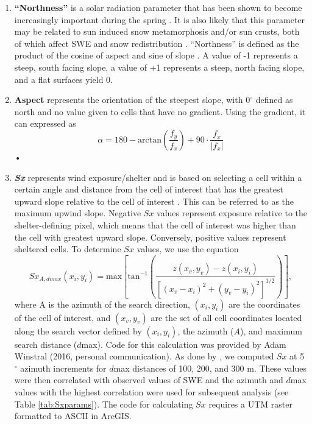 \documentclass[12pt]{article}
\begin{document}
\begin{enumerate}
\item[] \textbf{``Northness''} is a solar radiation parameter that has been shown to become increasingly important during the spring \citep{Revuelto2014}. It is also likely that this parameter may be related to sun induced snow metamorphosis and/or sun crusts, both of which affect SWE and snow redistribution \citep{McGrath2015}. ``Northness'' is defined as the product of the cosine of aspect and sine of slope \citep{Molotch2005}. A value of -1 represents a steep, south facing slope, a value of +1 represents a steep, north facing slope, and a flat surfaces yield 0. 

\item[] \textbf{Aspect} represents the orientation of the steepest slope, with 0${^\circ}$ defined as north and no value given to cells that have no gradient. Using the gradient, it can expressed as \citep{Olaya2009}
	\begin{equation}
	\alpha = 180 - \textrm{arctan}\left(\frac{ f_y}{ f_x}\right)+90 \cdot \frac{ f_x}{| f_x|}
	\end{equation}•

\item[] \textbf{\textit{Sx}} represents wind exposure/shelter and is based on selecting a cell within a certain angle and distance from the cell of interest that has the greatest upward slope relative to the cell of interest \citep{Winstral2002}. This can be referred to as the maximum upwind slope. Negative $Sx$ values represent exposure relative to the shelter-defining pixel, which means that the cell of interest was higher than the cell with greatest upward slope. Conversely, positive values represent sheltered cells. To determine $Sx$ values, we use the equation
\begin{equation}
Sx_{A, dmax}(x_i, y_i) = \textrm{max} \left[ \textrm{tan}^{-1} \left( \frac{z(x_v,y_v)-z(x_i,y_i)}{[(x_v-x_i)^2+(y_v-y_i)^2]^{1/2}} \right) \right] ,
\end{equation}
where A is the azimuth of the search direction, $(x_i, y_i)$ are the coordinates of the cell of interest, and $(x_v, y_v)$ are the set of all cell coordinates located along the search vector defined by	$(x_i, y_i)$, the azimuth ($A$), and maximum search distance ($d$max). Code for this calculation was provided by Adam Winstral (2016, personal communication). As done by \cite{McGrath2015}, we computed $Sx$ at 5$^{\circ}$ azimuth increments for $d$max distances of 100, 200, and 300 m. These values were then correlated with observed values of SWE and the azimuth and $d$max values with the highest correlation were used for subsequent analysis (see Table \ref{tab:Sxparams}). The code for calculating $Sx$ requires a UTM raster formatted to ASCII in ArcGIS. 
\end{enumerate}
\end{document}
